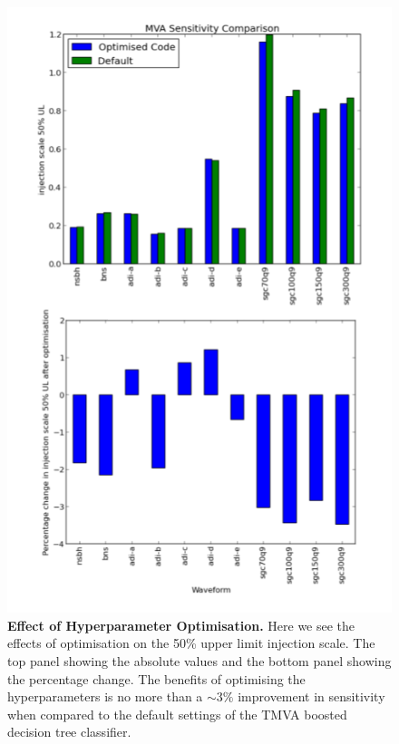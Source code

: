 \documentclass[11pt]{cuthesis}
\begin{document}
\begin{figure} %
\begin{center}
\includegraphics[width=0.8\linewidth]{opt_comparison.png}
\end{center}
\caption{\textbf{Effect of Hyperparameter Optimisation.} Here we see the effects of optimisation on the 50\% upper limit injection scale. The top panel showing the absolute values and the bottom panel showing the percentage change. The benefits of optimising the hyperparameters is no more than a $\sim3\%$ improvement in sensitivity when compared to the default settings of the TMVA boosted decision tree classifier. }
\label{fig:opt compare}
\end{figure}
\end{document}
